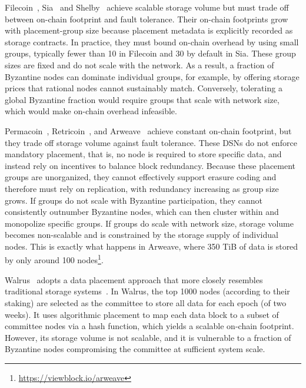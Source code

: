 Filecoin~\cite{filecoin}, Sia~\cite{sia} and Shelby~\cite{shelby} achieve scalable storage volume but must trade off between on-chain footprint and fault tolerance.
Their on-chain footprints grow with placement-group size because placement metadata is explicitly recorded as storage contracts.
In practice, they must bound on-chain overhead by using small groups, typically fewer than 10 in Filecoin and 30 by default in Sia.
These group sizes are fixed and do not scale with the network.
As a result, a fraction of Byzantine nodes can dominate individual groups, for example, by offering storage prices that rational nodes cannot sustainably match.
Conversely, tolerating a global Byzantine fraction would require groups that scale with network size, which would make on-chain overhead infeasible.

Permacoin~\cite{permacoin}, Retricoin~\cite{retricoin}, and Arweave~\cite{arweave} achieve constant on-chain footprint, but they trade off storage volume against fault tolerance.
These DSNs do not enforce mandatory placement, that is, no node is required to store specific data, and instead rely on incentives to balance block redundancy.
Because these placement groups are unorganized, they cannot effectively support erasure coding and therefore must rely on replication, with redundancy increasing as group size grows.
If groups do not scale with Byzantine participation, they cannot consistently outnumber Byzantine nodes, which can then cluster within and monopolize specific groups.
If groups do scale with network size, storage volume becomes non-scalable and is constrained by the storage supply of individual nodes.
This is exactly what happens in Arweave, where 350 TiB of data is stored by only around 100 nodes\footnote{\url{https://viewblock.io/arweave}}.

Walrus~\cite{walrus} adopts a data placement approach that more closely resembles traditional storage systems~\cite{ceph}.
In Walrus, the top 1000 nodes (according to their staking) are selected as the committee to store all data for each epoch (of two weeks).
It uses algorithmic placement to map each data block to a subset of committee nodes via a hash function, which yields a scalable on-chain footprint.
However, its storage volume is not scalable, and it is vulnerable to a fraction of Byzantine nodes compromising the committee at sufficient system scale.


